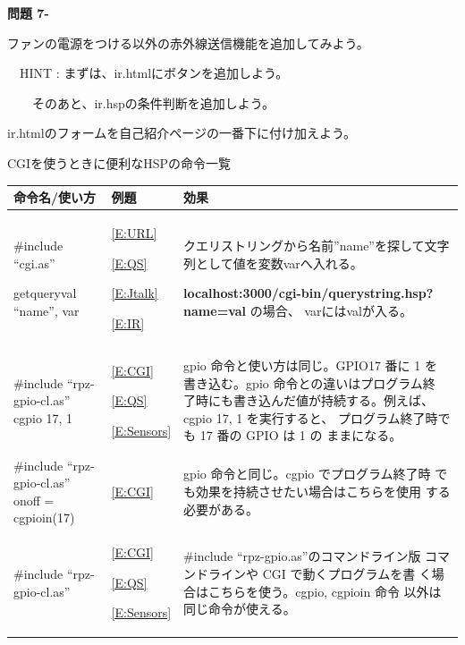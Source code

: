 \documentclass[a4paper,12pt,dvipdfmx]{jarticle}
\newcounter{Question}
\renewcommand\theQuestion{\textbf{問題 7-\arabic{Question}}}
\begin{document}
\bigskip

\bigskip
{}\theQuestion

ファンの電源をつける以外の赤外線送信機能を追加してみよう。

\ \ HINT :
まずは、ir.htmlにボタンを追加しよう。

\ \ \ \ そのあと、ir.hspの条件判断を追加しよう。

ir.htmlのフォームを自己紹介ページの一番下に付け加えよう。


\bigskip


\bigskip


\clearpage
CGIを使うときに便利なHSPの命令一覧

\begin{flushleft}
	\tablefirsthead{}
	\tablehead{}
	\tabletail{}
	\tablelasttail{}
	\begin{supertabular}{|m{5.467cm}|m{3.181cm}|m{7.7cm}|}
		\hline
		命令名/使い方 &
		例題 &
		効果\\\hline
		\#include “cgi.as”

		getqueryval “name”, var &
		\ref*{E:URL}

		\ref*{E:QS}

		\ref*{E:Jtalk}

		\ref*{E:IR} &
		クエリストリングから名前”name”を探して文字列として値を変数varへ入れる。

		\textbf{localhost:3000/cgi-bin/querystring.hsp?name=val}
		の場合、
		varにはvalが入る。\\\hline

		\#include “rpz-gpio-cl.as”
		cgpio 17, 1&
		\ref*{E:CGI}

		\ref*{E:QS}

		\ref*{E:Sensors} &
		gpio 命令と使い方は同じ。GPIO17 番に 1 を
		書き込む。gpio 命令との違いはプログラム終
		了時にも書き込んだ値が持続する。例えば、
		cgpio 17, 1 を実行すると、
		プログラム終了時でも 17 番の GPIO は 1 の
		ままになる。\\\hline

		\#include “rpz-gpio-cl.as”
		onoff = cgpioin(17)&
		\ref*{E:CGI} &
		gpio 命令と同じ。cgpio でプログラム終了時
		でも効果を持続させたい場合はこちらを使用
		する必要がある。\\\hline

		\#include “rpz-gpio-cl.as”&
		\ref*{E:CGI}

		\ref*{E:QS}

		\ref*{E:Sensors} &
		\#include “rpz-gpio.as”のコマンドライン版
		コマンドラインや CGI で動くプログラムを書
		く場合はこちらを使う。cgpio, cgpioin 命令
		以外は同じ命令が使える。\\\hline


\end{supertabular}
\end{flushleft}
\end{document}

